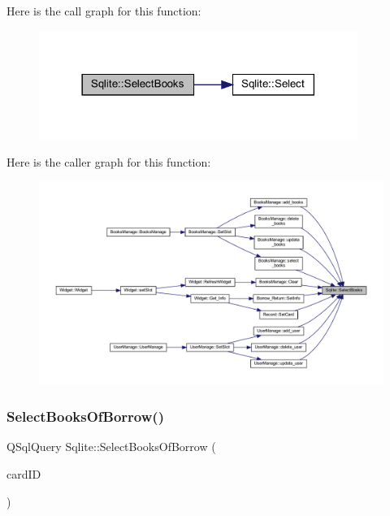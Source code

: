 Here is the call graph for this function\+:
\nopagebreak
\begin{figure}[H]
\begin{center}
\leavevmode
\includegraphics[width=294pt]{class_sqlite_addc1fbbdf661fd568535ddea8280fbd2_cgraph}
\end{center}
\end{figure}
Here is the caller graph for this function\+:
\nopagebreak
\begin{figure}[H]
\begin{center}
\leavevmode
\includegraphics[width=350pt]{class_sqlite_addc1fbbdf661fd568535ddea8280fbd2_icgraph}
\end{center}
\end{figure}
\mbox{\label{class_sqlite_ab9e451e38960661c5a493948453b63c7}} 
\subsubsection{\texorpdfstring{SelectBooksOfBorrow()}{SelectBooksOfBorrow()}}
{\footnotesize\ttfamily Q\+Sql\+Query Sqlite\+::\+Select\+Books\+Of\+Borrow (\begin{DoxyParamCaption}\item[{Q\+String}]{card\+ID }\end{DoxyParamCaption})}

